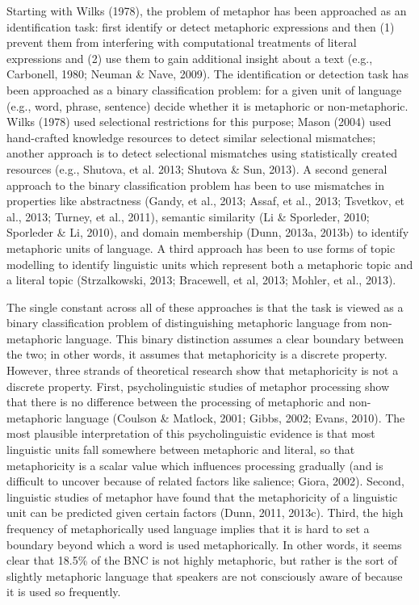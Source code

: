 \documentclass[11pt]{article}
\begin{document}
Starting with Wilks (1978), the problem of metaphor has been approached as an identification task: first identify or detect metaphoric expressions and then (1) prevent them from interfering with computational treatments of literal expressions and (2) use them to gain additional insight about a text (e.g., Carbonell, 1980; Neuman \& Nave, 2009). The identification or detection task has been approached as a binary classification problem: for a given unit of language (e.g., word, phrase, sentence) decide whether it is metaphoric or non-metaphoric. Wilks (1978) used selectional restrictions for this purpose; Mason (2004) used hand-crafted knowledge resources to detect similar selectional mismatches; another approach is to detect selectional mismatches using statistically created resources (e.g., Shutova, et al. 2013; Shutova \& Sun, 2013). A second general approach to the binary classification problem has been to use mismatches in properties like abstractness (Gandy, et al., 2013; Assaf, et al., 2013; Tsvetkov, et al., 2013; Turney, et al., 2011), semantic similarity (Li \& Sporleder, 2010; Sporleder \& Li, 2010), and domain membership (Dunn, 2013a, 2013b) to identify metaphoric units of language. A third approach has been to use forms of topic modelling to identify linguistic units which represent both a metaphoric topic and a literal topic (Strzalkowski, 2013; Bracewell, et al, 2013; Mohler, et al., 2013).

The single constant across all of these approaches is that the task is viewed as a binary classification problem of distinguishing metaphoric language from non-metaphoric language. This binary distinction assumes a clear boundary between the two; in other words, it assumes that metaphoricity is a discrete property. However, three strands of theoretical research show that metaphoricity is not a discrete property. First, psycholinguistic studies of metaphor processing show that there is no difference between the processing of metaphoric and non-metaphoric language (Coulson \& Matlock, 2001; Gibbs, 2002; Evans, 2010). The most plausible interpretation of this psycholinguistic evidence is that most linguistic units fall somewhere between metaphoric and literal, so that metaphoricity is a scalar value which influences processing gradually (and is difficult to uncover because of related factors like salience; Giora, 2002). Second, linguistic studies of metaphor have found that the metaphoricity of a linguistic unit can be predicted given certain factors (Dunn, 2011, 2013c). Third, the high frequency of metaphorically used language implies that it is hard to set a boundary beyond which a word is used metaphorically. In other words, it seems clear that 18.5\% of the BNC is not highly metaphoric, but rather is the sort of slightly metaphoric language that speakers are not consciously aware of because it is used so frequently.
\end{document}
